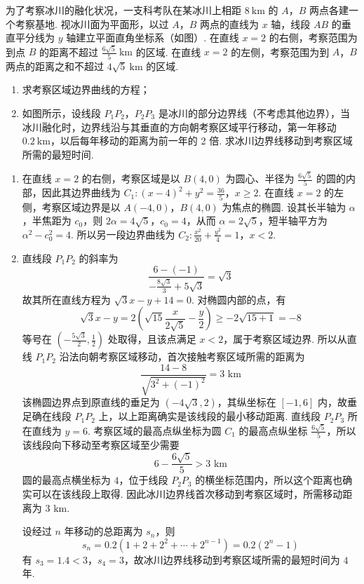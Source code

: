 \begin{problem}
为了考察冰川的融化状况，一支科考队在某冰川上相距 \(8 \mathrm{~km}\) 的 \(A\)，\(B\) 两点各建一个考察基地. 视冰川面为平面形，以过 \(A\)，\(B\) 两点的直线为 \(x\) 轴，线段 \(AB\) 的垂直平分线为 \(y\) 轴建立平面直角坐标系（如图）. 在直线 \(x = 2\) 的右侧，考察范围为到点 \(B\) 的距离不超过 \(\frac{6\sqrt{5}}{5} \mathrm{~km}\) 的区域. 在直线 \(x = 2\) 的左侧，考察范围为到 \(A\)，\(B\) 两点的距离之和不超过 \(4\sqrt{5} \mathrm{~km}\) 的区域.

\begin{enumerate}
\item 求考察区域边界曲线的方程；
\item 如图所示，设线段 \(P_{1}P_{2}\)，\(P_{2}P_{3}\) 是冰川的部分边界线（不考虑其他边界），当冰川融化时，边界线沿与其垂直的方向朝考察区域平行移动，第一年移动 \(0.2 \mathrm{~km}\)，以后每年移动的距离为前一年的 2 倍. 求冰川边界线移动到考察区域所需的最短时间.
\end{enumerate}


\begin{solution}
\begin{enumerate}
\item 在直线 \(x=2\) 的右侧，考察区域是以 \(B\left(4,0\right)\) 为圆心、半径为 \(\frac{6\sqrt{5}}{5}\) 的圆的内部，因此其边界曲线为
\(C_{1}:\left(x-4\right)^2+y^2=\frac{36}{5}\)，\(x\geqslant2\).
在直线 \(x=2\) 的左侧，考察区域边界是以 \(A\left(-4,0\right)\)，\(B\left(4,0\right)\) 为焦点的椭圆. 设其长半轴为 \(\alpha\)，半焦距为 \(c_{0}\)，则 \(2\alpha=4\sqrt{5}\)，\(c_{0}=4\)，从而 \(\alpha=2\sqrt{5}\)，短半轴平方为 \(\alpha^2-c_{0}^2=4\). 所以另一段边界曲线为
\(C_{2}:\frac{x^2}{20}+\frac{y^2}{4}=1\)，\(x<2\).
\item 直线段 \(P_{1}P_{2}\) 的斜率为
\[
\frac{6-(-1)}{-\frac{8\sqrt{3}}{3}+5\sqrt{3}}=\sqrt{3}
\]
故其所在直线方程为 \(\sqrt{3}x-y+14=0\). 对椭圆内部的点，有
\[
\sqrt{3}x-y=2\left(\sqrt{15}\frac{x}{2\sqrt{5}}-\frac{y}{2}\right)\geqslant-2\sqrt{15+1}=-8
\]
等号在 \(\left(-\frac{5\sqrt{3}}{2},\frac{1}{2}\right)\) 处取得，且该点满足 \(x<2\)，属于考察区域边界. 所以从直线 \(P_{1}P_{2}\) 沿法向朝考察区域移动，首次接触考察区域所需的距离为
\[
\frac{14-8}{\sqrt{3^2+(-1)^2}}=3\text{ km}
\]
该椭圆边界点到原直线的垂足为 \((-4\sqrt{3},2)\)，其纵坐标在 \([-1,6]\) 内，故垂足确在线段 \(P_{1}P_{2}\) 上，以上距离确实是该线段的最小移动距离.
直线段 \(P_{2}P_{3}\) 所在直线为 \(y=6\). 考察区域的最高点纵坐标为圆 \(C_{1}\) 的最高点纵坐标 \(\frac{6\sqrt{5}}{5}\)，所以该线段向下移动至考察区域至少需要
\[
6-\frac{6\sqrt{5}}{5}>3\text{ km}
\]
圆的最高点横坐标为 \(4\)，位于线段 \(P_{2}P_{3}\) 的横坐标范围内，所以这个距离也确实可以在该线段上取得.
因此冰川边界线首次移动到考察区域时，所需移动距离为 \(3\text{ km}\).

设经过 \(n\) 年移动的总距离为 \(s_n\)，则
\[
s_n=0.2\left(1+2+2^2+\cdots+2^{n-1}\right)=0.2\left(2^n-1\right)
\]
有 \(s_3=1.4<3\)，\(s_4=3\)，故冰川边界线移动到考察区域所需的最短时间为 \(4\) 年.
\end{enumerate}
\end{solution}
\end{problem}

